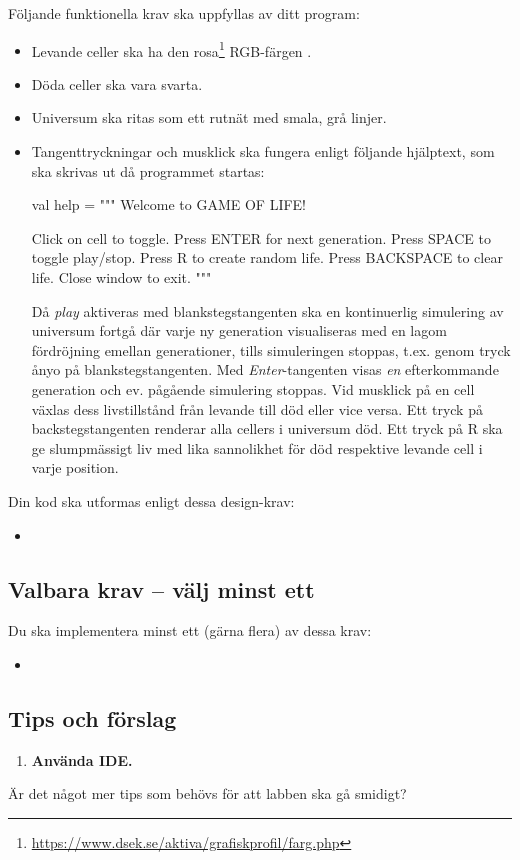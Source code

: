 Följande funktionella krav ska uppfyllas av ditt program:
\begin{itemize}[nosep, label={$\square$},]
\item Levande celler ska ha den rosa\footnote{\url{https://www.dsek.se/aktiva/grafiskprofil/farg.php}} RGB-färgen .
\item Döda celler ska vara svarta.
\item Universum ska ritas som ett rutnät med smala, grå linjer.
\item Tangenttryckningar och musklick ska fungera enligt följande hjälptext, som ska skrivas ut då programmet startas:
\begin{Code}
  val help = """
    Welcome to GAME OF LIFE!

    Click on cell to toggle.
    Press ENTER for next generation.
    Press SPACE to toggle play/stop.
    Press R to create random life.
    Press BACKSPACE to clear life.
    Close window to exit.
  """
\end{Code}
Då \emph{play} aktiveras med blankstegstangenten ska en kontinuerlig simulering av universum fortgå där varje ny generation visualiseras med en lagom fördröjning emellan generationer, tills simuleringen stoppas, t.ex. genom tryck ånyo på blankstegstangenten. Med \emph{Enter}-tangenten visas \emph{en} efterkommande generation och ev. pågående simulering stoppas. Vid musklick på en cell växlas dess livstillstånd från levande till död eller vice versa. Ett tryck på backstegstangenten renderar alla cellers i universum död. Ett tryck på R ska ge slumpmässigt liv med lika sannolikhet för död respektive levande cell i varje position.

\end{itemize}

\vspace{1em}\noindent Din kod ska utformas enligt dessa design-krav:
\begin{itemize}[nosep, label={$\square$}]
\item
\end{itemize}



\subsection{Valbara krav -- välj minst ett}

Du ska implementera minst ett (gärna flera) av dessa krav:
\begin{itemize}[nosep, label={$\square$}]
\item
\end{itemize}



\subsection{Tips och förslag}

\begin{enumerate}[leftmargin=*]
\item \textbf{Använda IDE.}
\end{enumerate}

\noindent\TODO Är det något mer tips som behövs för att labben ska gå smidigt?

